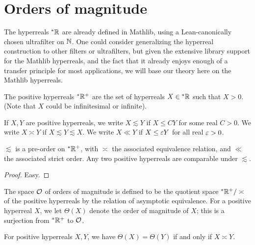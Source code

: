 \chapter{Orders of magnitude}\label{ch:order_of_magnitude}

The hyperreals ${}^* {\mathbb R}$ are already defined in Mathlib, using a Lean-canonically chosen ultrafilter on ${\mathbb N}$.  One could consider generalizing the hyperreal construction to other filters or ultrafilters, but given the extensive library support for the Mathlib hyperreals, and the fact that it already enjoys enough of a transfer principle for most applications, we will base our theory here on the Mathlib hyperreals.

\begin{definition}\label{pos-hyperreal}\leanok  The positive hyperreals ${}^* {\mathbb R}^+$ are the set of hyperreals $X \in {}^* {\mathbb R}$ such that $X > 0$.  (Note that $X$ could be infinitesimal or infinite).

If $X,Y$ are positive hyperreals, we write $X \lesssim Y$ if $X \leq CY$ for some real $C>0$.  We write $X \asymp Y$ if $X \lesssim Y \lesssim X$.  We write $X \ll Y$ if $X \leq \varepsilon Y$ for all real $\varepsilon>0$.
\end{definition}

\begin{lemma}\label{lesssim-order}  $\lesssim$ is a pre-order on ${}^* {\mathbb R}^+$, with $\asymp$ the associated equivalence relation, and $\ll$ the associated strict order.  Any two positive hyperreals are comparable under $\lesssim$.
\end{lemma}

\begin{proof} Easy.
\end{proof}

\begin{definition}\label{ord-def} The space ${\mathcal O}$ of orders of magnitude is defined to be the quotient space ${}^* {\mathbb R}^+ / \asymp$ of the positive hyperreals by the relation of asymptotic equivalence.  For a positive hyperreal $X$, we let $\Theta(X)$ denote the order of magnitude of $X$; this is a surjection from ${}^* {\mathbb R}^+$ to ${\mathcal O}$.
\end{definition}


\begin{lemma}\label{theta-kernel} For positive hyperreals $X,Y$, we have $\Theta(X) = \Theta(Y)$ if and only if $X \asymp Y$.
\end{lemma}

